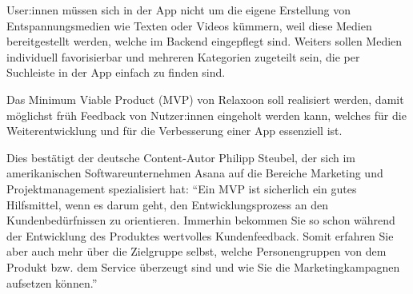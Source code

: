 User:innen müssen sich in der App nicht um die eigene Erstellung von Entspannungsmedien wie Texten oder Videos
kümmern, weil diese Medien bereitgestellt werden, welche im Backend eingepflegt sind. Weiters sollen Medien
individuell favorisierbar und mehreren Kategorien zugeteilt sein, die per Suchleiste in der App einfach zu
finden sind.

Das Minimum Viable Product (MVP) von Relaxoon soll realisiert werden, damit möglichst früh Feedback von Nutzer:innen
eingeholt werden kann, welches für die Weiterentwicklung und für die Verbesserung einer App essenziell ist.

Dies bestätigt der deutsche Content-Autor Philipp Steubel, der sich im amerikanischen Softwareunternehmen Asana
auf die Bereiche Marketing und 
Projektmanagement spezialisiert hat: "`Ein MVP ist sicherlich ein gutes Hilfsmittel, wenn es darum geht, den 
Entwicklungsprozess an den Kundenbedürfnissen zu orientieren. Immerhin bekommen Sie so schon während der 
Entwicklung des Produktes wertvolles Kundenfeedback. Somit erfahren Sie aber auch mehr über die Zielgruppe 
selbst, welche Personengruppen von dem Produkt bzw. dem Service überzeugt sind und wie Sie die Marketingkampagnen
aufsetzen können."' \cite{mvp}